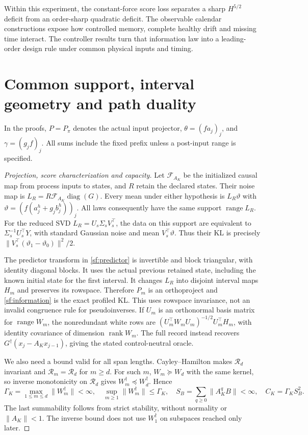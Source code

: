 \documentclass[journal]{IEEEtran}
\begin{document}
Within this experiment, the constant-force score loss separates a sharp
$H^{5/2}$ deficit from an order-sharp quadratic deficit. The observable
calendar constructions expose how controlled memory, complete healthy drift
and missing time interact. The controller results turn that information law
into a leading-order design rule under common physical inputs and timing.

\appendices
\section{Common support, interval geometry and path duality}\label{sf:geometry}
In the proofs, $P=P_\pi$ denotes the actual input projector,
$\theta=(fa_j)_j$, and $\gamma=(g_jf)_j$. All sums include the fixed prefix
unless a post-input range is specified.
\begin{proof}[Projection, score characterization and capacity]\leavevmode
Let $\mathcal F_{A_K}$ be the initialized causal map from process
inputs to states, and $R$ retain the declared states. Their noise map is
$L_R=R\mathcal F_{A_K}\operatorname{diag}(G)$.
Every mean under either hypothesis is $L_R\vartheta$ with
$\vartheta=(f(a_j^h+g_jb_j^h))_j$. All laws consequently have the
same support $\operatorname{range}L_R$.
For the reduced SVD $L_R=U_s\Sigma_sV_s^\top$, the data on this support
are equivalent to $\Sigma_s^{-1}U_s^\top Y$, with standard Gaussian
noise and mean $V_s^\top\vartheta$. Thus their KL is precisely
$\|V_s^\top(\vartheta_1-\vartheta_0)\|^2/2$.

The predictor transform in \eqref{sf:predictor} is invertible and
block triangular, with identity diagonal blocks. It uses the actual previous
retained state, including the known initial state for the first interval.
It changes $L_R$ into disjoint interval maps $H_m$ and preserves its
rowspace. Therefore $P_m$ is an orthoproject and
\eqref{sf:information} is the exact profiled KL.
This uses rowspace invariance, not an invalid congruence rule for
pseudoinverses. If $U_m$ is an orthonormal basis matrix for $\operatorname{range}W_m$, the
nonredundant white rows are
$(U_m^\top W_mU_m)^{-1/2}U_m^\top H_m$, with identity covariance
of dimension $\operatorname{rank}W_m$.
The full record instead recovers
$G^\dagger(x_j-A_Kx_{j-1})$, giving the stated control-neutral oracle.

We also need a bound valid for all span lengths.
Cayley--Hamilton makes $\mathcal R_d$ invariant and
$\mathcal R_m=\mathcal R_d$ for $m\ge d$.
For such $m$, $W_m\succeq W_d$ with the same kernel, so inverse
monotonicity on $\mathcal R_d$ gives $W_m^\dagger\preceq W_d^\dagger$.
Hence
\begin{equation}\label{sf:gamma}
\Gamma_K=\max_{1\le m\le d}\|W_m^\dagger\|<\infty,\quad
\sup_{m\ge1}\|W_m^\dagger\|\le\Gamma_K,\quad
S_B=\sum_{q\ge0}\|A_K^qB\|<\infty,\quad C_K=\Gamma_KS_B^2 .
\end{equation}
The last summability follows from strict stability, without normality
or $\|A_K\|<1$. The inverse bound does not use $W_1^\dagger$ on
subspaces reached only later.


\end{proof}
\end{document}
